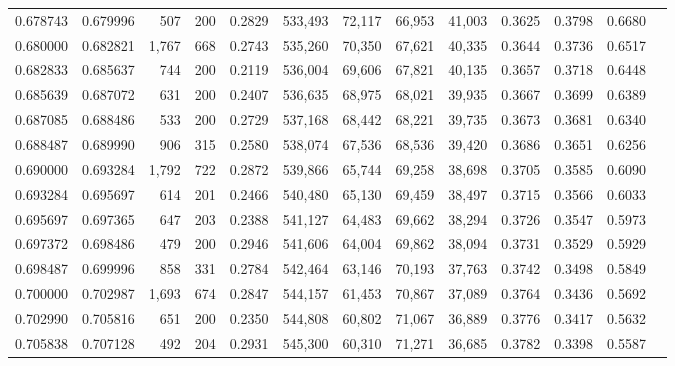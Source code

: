 \begin{tabular}{rrrrrrrrrrrrr}
0.678743 & 0.679996 &   507 & 200 &                                     0.2829 & 533,493 &  72,117 &  66,953 &  41,003 & 0.3625 & 0.3798 & 0.6680 \\
0.680000 & 0.682821 & 1,767 & 668 &                                     0.2743 & 535,260 &  70,350 &  67,621 &  40,335 & 0.3644 & 0.3736 & 0.6517 \\
0.682833 & 0.685637 &   744 & 200 &                                     0.2119 & 536,004 &  69,606 &  67,821 &  40,135 & 0.3657 & 0.3718 & 0.6448 \\
0.685639 & 0.687072 &   631 & 200 &                                     0.2407 & 536,635 &  68,975 &  68,021 &  39,935 & 0.3667 & 0.3699 & 0.6389 \\
0.687085 & 0.688486 &   533 & 200 &                                     0.2729 & 537,168 &  68,442 &  68,221 &  39,735 & 0.3673 & 0.3681 & 0.6340 \\
0.688487 & 0.689990 &   906 & 315 &                                     0.2580 & 538,074 &  67,536 &  68,536 &  39,420 & 0.3686 & 0.3651 & 0.6256 \\
0.690000 & 0.693284 & 1,792 & 722 &                                     0.2872 & 539,866 &  65,744 &  69,258 &  38,698 & 0.3705 & 0.3585 & 0.6090 \\
0.693284 & 0.695697 &   614 & 201 &                                     0.2466 & 540,480 &  65,130 &  69,459 &  38,497 & 0.3715 & 0.3566 & 0.6033 \\
0.695697 & 0.697365 &   647 & 203 &                                     0.2388 & 541,127 &  64,483 &  69,662 &  38,294 & 0.3726 & 0.3547 & 0.5973 \\
0.697372 & 0.698486 &   479 & 200 &                                     0.2946 & 541,606 &  64,004 &  69,862 &  38,094 & 0.3731 & 0.3529 & 0.5929 \\
0.698487 & 0.699996 &   858 & 331 &                                     0.2784 & 542,464 &  63,146 &  70,193 &  37,763 & 0.3742 & 0.3498 & 0.5849 \\
0.700000 & 0.702987 & 1,693 & 674 &                                     0.2847 & 544,157 &  61,453 &  70,867 &  37,089 & 0.3764 & 0.3436 & 0.5692 \\
0.702990 & 0.705816 &   651 & 200 &                                     0.2350 & 544,808 &  60,802 &  71,067 &  36,889 & 0.3776 & 0.3417 & 0.5632 \\
0.705838 & 0.707128 &   492 & 204 &                                     0.2931 & 545,300 &  60,310 &  71,271 &  36,685 & 0.3782 & 0.3398 & 0.5587 \\

\end{tabular}
